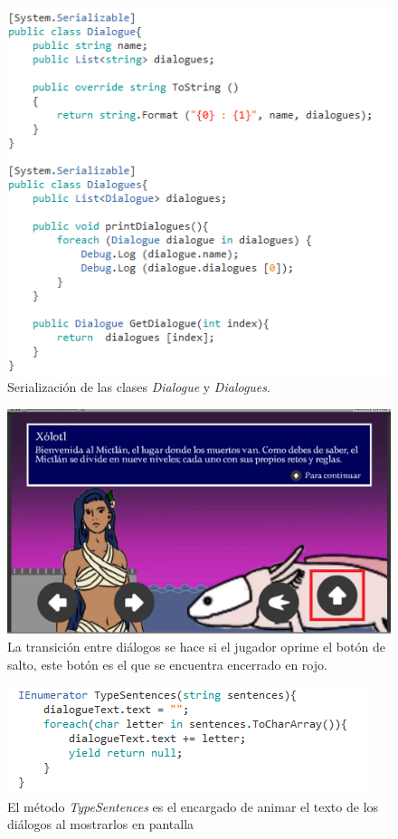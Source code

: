 	\begin{figure}[h]
		\centering
		\includegraphics[height=0.3 \textheight]{03TrabajoRealizado/imagenes/dialogueFile.png}
		\caption{Serialización de las clases \textit{Dialogue} y \textit{Dialogues}.}
		\label{fig:Dialogues}
	\end{figure}

	\begin{figure}[h]
		\centering
		\includegraphics[height=0.2 \textheight]{03TrabajoRealizado/imagenes/DialogueOnScreen.png}
		\caption{La transición entre diálogos se hace si el jugador oprime el 
		botón de salto, este botón es el que se encuentra encerrado en rojo.}
		\label{fig:NextDialogueBottom}
	\end{figure}

	\begin{figure}[h]
		\centering
		\includegraphics[height=0.15 \textheight]{03TrabajoRealizado/imagenes/dialogueController02.png}
		\caption{El método \textit{TypeSentences} es el encargado de animar el texto de los diálogos al mostrarlos en pantalla}
		\label{fig:DialoguesCtrl}
	\end{figure}

